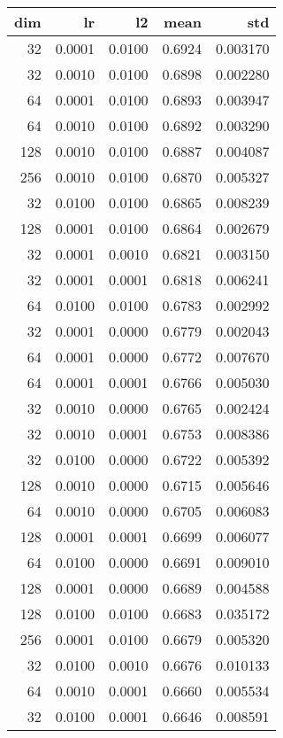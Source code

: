\begin{tabular}{rrrrr}
\toprule
 dim &      lr &      l2 &    mean &       std \\
\midrule
  32 &  0.0001 &  0.0100 &  0.6924 &  0.003170 \\
  32 &  0.0010 &  0.0100 &  0.6898 &  0.002280 \\
  64 &  0.0001 &  0.0100 &  0.6893 &  0.003947 \\
  64 &  0.0010 &  0.0100 &  0.6892 &  0.003290 \\
 128 &  0.0010 &  0.0100 &  0.6887 &  0.004087 \\
 256 &  0.0010 &  0.0100 &  0.6870 &  0.005327 \\
  32 &  0.0100 &  0.0100 &  0.6865 &  0.008239 \\
 128 &  0.0001 &  0.0100 &  0.6864 &  0.002679 \\
  32 &  0.0001 &  0.0010 &  0.6821 &  0.003150 \\
  32 &  0.0001 &  0.0001 &  0.6818 &  0.006241 \\
  64 &  0.0100 &  0.0100 &  0.6783 &  0.002992 \\
  32 &  0.0001 &  0.0000 &  0.6779 &  0.002043 \\
  64 &  0.0001 &  0.0000 &  0.6772 &  0.007670 \\
  64 &  0.0001 &  0.0001 &  0.6766 &  0.005030 \\
  32 &  0.0010 &  0.0000 &  0.6765 &  0.002424 \\
  32 &  0.0010 &  0.0001 &  0.6753 &  0.008386 \\
  32 &  0.0100 &  0.0000 &  0.6722 &  0.005392 \\
 128 &  0.0010 &  0.0000 &  0.6715 &  0.005646 \\
  64 &  0.0010 &  0.0000 &  0.6705 &  0.006083 \\
 128 &  0.0001 &  0.0001 &  0.6699 &  0.006077 \\
  64 &  0.0100 &  0.0000 &  0.6691 &  0.009010 \\
 128 &  0.0001 &  0.0000 &  0.6689 &  0.004588 \\
 128 &  0.0100 &  0.0100 &  0.6683 &  0.035172 \\
 256 &  0.0001 &  0.0100 &  0.6679 &  0.005320 \\
  32 &  0.0100 &  0.0010 &  0.6676 &  0.010133 \\
  64 &  0.0010 &  0.0001 &  0.6660 &  0.005534 \\
  32 &  0.0100 &  0.0001 &  0.6646 &  0.008591 \\

\end{tabular}
